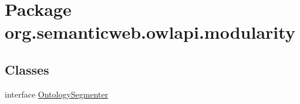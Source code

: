 \hypertarget{namespaceorg_1_1semanticweb_1_1owlapi_1_1modularity}{\section{Package org.\-semanticweb.\-owlapi.\-modularity}
\label{namespaceorg_1_1semanticweb_1_1owlapi_1_1modularity}
}
\subsection*{Classes}
\begin{DoxyCompactItemize}
\item 
interface \hyperlink{interfaceorg_1_1semanticweb_1_1owlapi_1_1modularity_1_1_ontology_segmenter}{Ontology\-Segmenter}
\end{DoxyCompactItemize}
